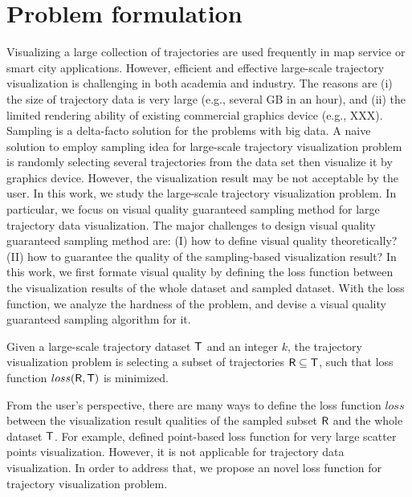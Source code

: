 \section{Problem formulation}
Visualizing a large collection of trajectories are used frequently in map service or smart city applications.
However, efficient and effective large-scale trajectory visualization is challenging in both academia and industry.
The reasons are (i) the size of trajectory data is very large (e.g., several GB in an hour),
and (ii) the limited rendering ability of existing commercial graphics device (e.g., XXX).
Sampling is a delta-facto solution for the problems with big data.
A naive solution to employ sampling idea for large-scale trajectory visualization problem is
randomly selecting several trajectories from the data set then visualize it by graphics device.
However, the visualization result may be not acceptable by the user.
In this work, we study the large-scale trajectory visualization problem.
In particular, we focus on visual quality guaranteed sampling method for large trajectory data visualization.
The major challenges to design visual quality guaranteed sampling method are:
(I) how to define visual quality theoretically? (II) how to guarantee the quality of the sampling-based visualization result?
In this work, we first formate visual quality by defining the loss function between the visualization results of the whole dataset and sampled dataset.
With the loss function, we analyze the hardness of the problem, and devise a visual quality guaranteed sampling algorithm for it.


\begin{problem}\label{prob:def}
Given a large-scale trajectory dataset $\mathsf{T}$ and an integer $k$,
the trajectory visualization problem is selecting a subset of trajectories $\mathsf{R} \subseteq \mathsf{T}$, such that loss function $loss(\mathsf{R},\mathsf{T})$ is minimized.
\end{problem}

From the user’s perspective, there are many ways to define the loss function $loss$ between the visualization result qualities of the sampled subset $\mathsf{R}$ and the whole dataset $\mathsf{T}$.
For example, \cite{park2016visualization} defined point-based loss function for very large scatter points visualization.
However, it is not applicable for trajectory data visualization.
In order to address that, we propose an novel loss function for trajectory visualization problem.

